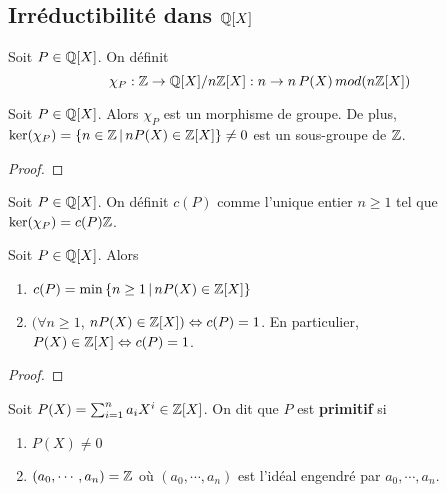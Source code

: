 \subsection{Irréductibilité dans $\mathbb{Q}[X]$}

\begin{definition}
	Soit $P \in \mathbb{Q}[X]$. On définit
	\begin{equation}
		\chi_{P} : \mathbb{Z} \rightarrow \mathbb{Q}[X] / n \mathbb{Z}[X] : n
		\rightarrow n \, P(X) \, mod(n \mathbb{Z}[X])
	\end{equation}
\end{definition}

\begin{proposition}
	Soit $P \in \mathbb{Q}[X]$. Alors $\chi_{P}$ est un morphisme de groupe. De
	plus, $\ker(\chi_{P}) = \left\{n \in \mathbb{Z} \, | \, n P(X) \in \mathbb{Z}[X] \right\}
	\neq 0$ est un sous-groupe de $\mathbb{Z}$.
\end{proposition}

\ifdefined\outputproof
\begin{proof}

\end{proof}
\fi

\begin{definition}
	Soit $P \in \mathbb{Q}[X]$. On définit $c(P)$ comme l'unique entier $n \geq
	1$ tel que $\ker(\chi_{P}) = c(P) \mathbb{Z}$.
\end{definition}

\begin{corollary}
	Soit $P \in \mathbb{Q}[X]$.
	Alors
	\begin{enumerate}
		\item $c(P) = \min \left\{n \geq 1 \, | \, n P(X) \in \mathbb{Z}[X] \right\}$
		\item $(\forall n \geq 1$, $n P(X) \in \mathbb{Z}[X]) \Leftrightarrow c(P) = 1$.
			En particulier, $P(X) \in \mathbb{Z}[X] \Leftrightarrow c(P) = 1$.
	\end{enumerate}
\end{corollary}

\ifdefined\outputproof
\begin{proof}

\end{proof}
\fi

\begin{definition} 
	Soit $P(X) = \sum_{i = 1}^{n} a_{i} X^{i} \in \mathbb{Z}[X]$. On dit que $P$
	est \textbf{primitif} si
	\begin{enumerate}
		\item $P(X) \neq 0$
		\item $(a_{0}, \cdots, a_{n}) = \mathbb{Z}$ où $(a_{0}, \cdots, a_{n})$
			est l'idéal engendré par $a_{0}, \cdots, a_{n}$.
	\end{enumerate}
\end{definition}

